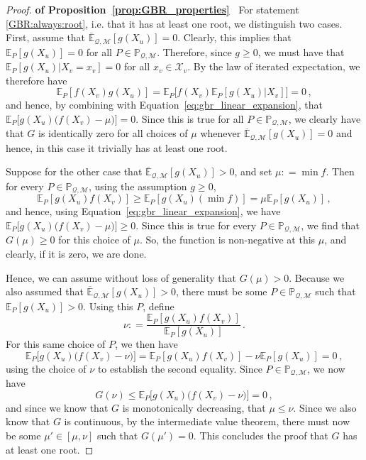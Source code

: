 \documentclass[twoside,11pt]{article}
\newcommand{\states}{\mathcal{X}}
\newcommand{\uexp}{\overline{\mathbb{E}}_{\rateset,\mathcal{M}}}
\newcommand{\rateset}{\mathcal{Q}}
\newcommand{\coloneqq}{:\!=}
\begin{document}
\begin{proof}{\bf of Proposition~\ref{prop:GBR_properties}~}
For statement \ref{GBR:always:root}, i.e. that it has at least one root, we distinguish two cases. First, assume that $\uexp[g(X_u)]=0$. Clearly, this implies that $\mathbb{E}_P[g(X_u)]=0$ for all $P\in\mathbb{P}_{\rateset,\mathcal{M}}$. Therefore, since $g\geq 0$, we must have that $\mathbb{E}_P[g(X_u)\vert X_v=x_v]=0$ for all $x_v\in\states_v$. By the law of iterated expectation, we therefore have
\begin{equation*}
\mathbb{E}_P[f(X_v)g(X_u)] = \mathbb{E}_P\bigl[f(X_v)\mathbb{E}_P[g(X_u)\vert X_v]\bigr] = 0\,,
\end{equation*}
and hence, by combining with Equation~\ref{eq:gbr_linear_expansion}, that $\mathbb{E}_P\bigl[g(X_u)\bigl(f(X_v) - \mu\bigr)\bigr]=0$. Since this is true for all $P\in\mathbb{P}_{\rateset,\mathcal{M}}$, we clearly have that $G$ is identically zero for all choices of $\mu$ whenever $\uexp[g(X_u)]=0$ and hence, in this case it trivially has at least one root.

Suppose for the other case that $\uexp[g(X_u)]>0$, and set $\mu\coloneqq \min f$. Then for every $P\in\mathbb{P}_{\rateset,\mathcal{M}}$, using the assumption $g\geq 0$,
\begin{equation*}
\mathbb{E}_P[g(X_u)f(X_v)] \geq \mathbb{E}_P[g(X_u)(\min f)] = \mu\mathbb{E}_P[g(X_u)]\,,
\end{equation*}
and hence, using Equation~\eqref{eq:gbr_linear_expansion}, we have $\mathbb{E}_P\bigl[g(X_u)\bigl(f(X_v) - \mu\bigr)\bigr] \geq 0$. Since this is true for every $P\in\mathbb{P}_{\rateset,\mathcal{M}}$, we find that $G(\mu)\geq 0$ for this choice of $\mu$. So, the function is non-negative at this $\mu$, and clearly, if it is zero, we are done.

Hence, we can assume without loss of generality that $G(\mu) > 0$. Because we also assumed that $\uexp[g(X_u)] > 0$, there must be some $P\in\mathbb{P}_{\rateset,\mathcal{M}}$ such that $\mathbb{E}_P[g(X_u)]>0$. Using this $P$, define
\begin{equation*}
\nu \coloneqq \frac{\mathbb{E}_P[g(X_u)f(X_v)]}{\mathbb{E}_P[g(X_u)]}\,.
\end{equation*}
For this same choice of $P$, we then have
\begin{equation*}
\mathbb{E}_P\bigl[g(X_u)\bigl(f(X_v) - \nu\bigr)\bigr] = \mathbb{E}_P[g(X_u)f(X_v)] - \nu\mathbb{E}_P[g(X_u)] = 0\,,
\end{equation*}
using the choice of $\nu$ to establish the second equality. Since $P\in\mathbb{P}_{\rateset,\mathcal{M}}$, we now have
\begin{equation*}
G(\nu) \leq \mathbb{E}_P\bigl[g(X_u)\bigl(f(X_v) - \nu\bigr)\bigr] = 0\,,
\end{equation*}
and since we know that $G$ is monotonically decreasing, that $\mu\leq \nu$. Since we also know that $G$ is continuous, by the intermediate value theorem, there must now be some $\mu'\in [\mu,\nu]$ such that $G(\mu') = 0$. This concludes the proof that $G$ has at least one root.


\end{proof}
\end{document}
